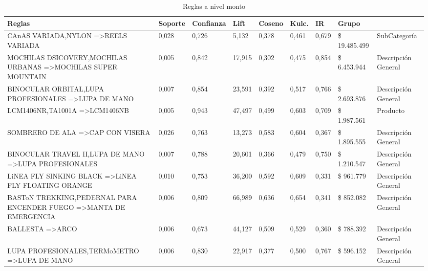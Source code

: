 \documentclass[]{article}
\begin{document}
	
	\begin{landscape}
		
		\begin{table}[]
			\centering
			\caption{Reglas a nivel monto}
			\label{Tab_Reg_Monto}%
			\begin{tabular}{lllllllll}
				{\bf Reglas}                                                                         & {\bf Soporte} & {\bf Confianza} & {\bf Lift} & {\bf Coseno} & {\bf Kulc.} & {\bf IR} & {\bf Grupo}\\
				\hline
				CAnAS VARIADA,NYLON =\textgreater REELS VARIADA                                & 0,028   & 0,726 & 5,132  & 0,378  & 0,461  & 0,679 & \$ 19.485.499 & SubCategoría        \\
				MOCHILAS DSICOVERY,MOCHILAS URBANAS =\textgreater MOCHILAS SUPER MOUNTAIN      & 0,005   & 0,842 & 17,915 & 0,302  & 0,475  & 0,854 & \$ 6.453.944  & Descripción General \\
				BINOCULAR ORBITAL,LUPA PROFESIONALES =\textgreater LUPA DE MANO                & 0,007   & 0,854 & 23,591 & 0,392  & 0,517  & 0,766 & \$ 2.693.876  & Descripción General \\
				LCM1406NR,TA1001A =\textgreater LCM1406NB                                      & 0,005   & 0,943 & 47,497 & 0,499  & 0,603  & 0,709 & \$ 1.987.561  & Producto            \\
				SOMBRERO DE ALA =\textgreater CAP CON VISERA                                   & 0,026   & 0,763 & 13,273 & 0,583  & 0,604  & 0,367 & \$ 1.895.555  & Descripción General \\
				BINOCULAR TRAVEL II,LUPA DE MANO =\textgreater LUPA PROFESIONALES              & 0,007   & 0,788 & 20,601 & 0,366  & 0,479  & 0,750 & \$ 1.210.547  & Descripción General \\
				LiNEA FLY SINKING BLACK =\textgreater LiNEA FLY FLOATING ORANGE                & 0,010   & 0,753 & 36,200 & 0,592  & 0,609  & 0,331 & \$ 961.779    & Descripción General \\
				BASToN TREKKING,PEDERNAL PARA ENCENDER FUEGO =\textgreater MANTA DE EMERGENCIA & 0,006   & 0,809 & 66,989 & 0,636  & 0,654  & 0,341 & \$ 852.082    & Descripción General \\
				BALLESTA =\textgreater ARCO                                                    & 0,006   & 0,673 & 44,127 & 0,509  & 0,529  & 0,360 & \$ 788.392    & Descripción General \\
				LUPA PROFESIONALES,TERMoMETRO =\textgreater LUPA DE MANO                       & 0,006   & 0,830 & 22,917 & 0,377  & 0,500  & 0,767 & \$ 596.152    & Descripción General
			\end{tabular}
		\end{table}	
		

\end{landscape}
\end{document}
